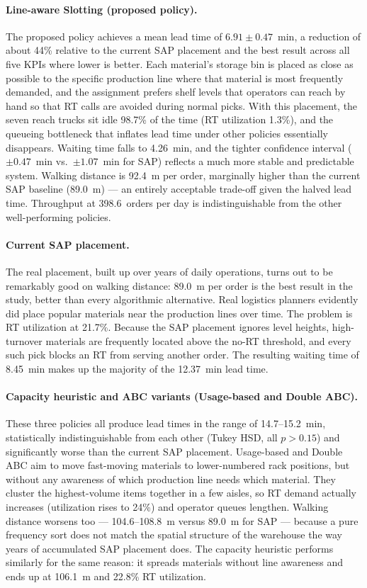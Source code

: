 \paragraph{Line-aware Slotting (proposed policy).}
The proposed policy achieves a mean lead time of $6.91 \pm 0.47$~min,
a reduction of about 44\% relative to the current SAP placement and
the best result across all five KPIs where lower is better.
Each material's storage bin is placed as close as possible to the
specific production line where that material is most frequently
demanded, and the assignment prefers shelf levels that operators can
reach by hand so that RT calls are avoided during normal picks.  With
this placement, the seven reach trucks sit idle 98.7\% of the time
(RT utilization 1.3\%), and the queueing bottleneck that inflates lead
time under other policies essentially disappears.  Waiting time falls
to 4.26~min, and the tighter confidence interval ($\pm 0.47$~min
vs.\ $\pm 1.07$~min for SAP) reflects a much more stable and
predictable system.  Walking distance is 92.4~m per order, marginally
higher than the current SAP baseline (89.0~m) --- an entirely
acceptable trade-off given the halved lead time.  Throughput at
398.6~orders per day is indistinguishable from the other well-performing
policies.

\paragraph{Current SAP placement.}
The real placement, built up over years of daily operations, turns out
to be remarkably good on walking distance: 89.0~m per order is the
best result in the study, better than every algorithmic alternative.
Real logistics planners evidently did place popular materials near the
production lines over time.  The problem is RT utilization at 21.7\%.
Because the SAP placement ignores level heights, high-turnover
materials are frequently located above the no-RT threshold, and every
such pick blocks an RT from serving another order.  The resulting
waiting time of 8.45~min makes up the majority of the 12.37~min lead
time.

\paragraph{Capacity heuristic and ABC variants (Usage-based and Double ABC).}
These three policies all produce lead times in the range of 14.7--15.2~min,
statistically indistinguishable from each other (Tukey HSD, all
$p > 0.15$) and significantly worse than the current SAP placement.
Usage-based and Double ABC aim to move fast-moving materials to
lower-numbered rack positions, but without any awareness of which
production line needs which material.  They cluster the highest-volume
items together in a few aisles, so RT demand actually increases
(utilization rises to 24\%) and operator queues lengthen.  Walking
distance worsens too --- 104.6--108.8~m versus 89.0~m for SAP ---
because a pure frequency sort does not match the spatial structure of
the warehouse the way years of accumulated SAP placement does.  The
capacity heuristic performs similarly for the same reason: it spreads
materials without line awareness and ends up at 106.1~m and 22.8\% RT
utilization.

